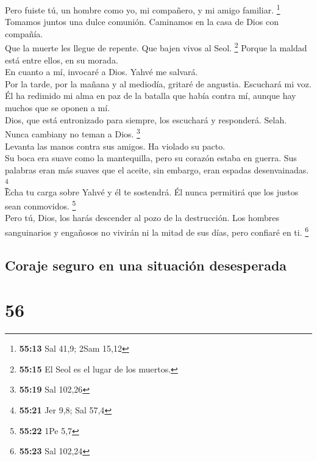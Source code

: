  Pero fuiste tú, un hombre como yo, mi compañero, y mi
amigo familiar. \footnote{\textbf{55:13} Sal 41,9; 2Sam 15,12}\\
 Tomamos juntos una dulce comunión. Caminamos en la casa
de Dios con compañía.\\
 Que la muerte les llegue de repente. Que bajen vivos al
Seol. \footnote{\textbf{55:15} El Seol es el lugar de los muertos.}
Porque la maldad está entre ellos, en su morada.\\
 En cuanto a mí, invocaré a Dios. Yahvé me salvará.\\
 Por la tarde, por la mañana y al mediodía, gritaré de
angustia. Escuchará mi voz.\\
 Él ha redimido mi alma en paz de la batalla que había
contra mí, aunque hay muchos que se oponen a mí.\\
 Dios, que está entronizado para siempre, los escuchará y
responderá. Selah. Nunca cambiany no teman a Dios. \footnote{\textbf{55:19}
  Sal 102,26}\\
 Levanta las manos contra sus amigos. Ha violado su
pacto.\\
 Su boca era suave como la mantequilla, pero su corazón
estaba en guerra. Sus palabras eran más suaves que el aceite, sin
embargo, eran espadas desenvainadas. \footnote{\textbf{55:21} Jer 9,8;
  Sal 57,4}\\
 Echa tu carga sobre Yahvé y él te sostendrá. Él nunca
permitirá que los justos sean conmovidos. \footnote{\textbf{55:22} 1Pe
  5,7}\\
 Pero tú, Dios, los harás descender al pozo de la
destrucción. Los hombres sanguinarios y engañosos no vivirán ni la mitad
de sus días, pero confiaré en ti. \footnote{\textbf{55:23} Sal 102,24}

\hypertarget{coraje-seguro-en-una-situaciuxf3n-desesperada}{%
\subsection{Coraje seguro en una situación
desesperada}\label{coraje-seguro-en-una-situaciuxf3n-desesperada}}

\hypertarget{section-54}{%
\section{56}\label{section-54}}

